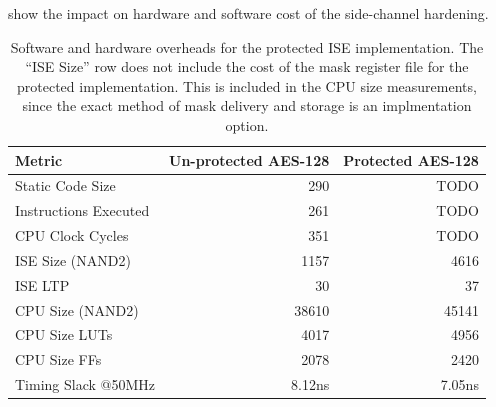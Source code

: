  show the impact on hardware and software cost
of the side-channel hardening.

\begin{table}[]
\centering
\begin{tabular}{lrr}
Metric                & Un-protected AES-128 & Protected AES-128 \\
\hline
Static Code Size      & 290                  & TODO              \\
Instructions Executed & 261                  & TODO              \\
CPU Clock Cycles      & 351                  & TODO              \\
ISE Size (NAND2)      & 1157                 & 4616              \\
ISE LTP               & 30                   & 37                \\
CPU Size (NAND2)      & 38610                & 45141             \\
CPU Size  LUTs        & 4017                 & 4956              \\
CPU Size  FFs         & 2078                 & 2420              \\
Timing Slack @50MHz   & 8.12ns               & 7.05ns
\end{tabular}
\caption{
Software and hardware overheads for the protected ISE implementation.
The ``ISE Size'' row does not include the cost of the mask register file
for the protected implementation.
This is included in the CPU size measurements, since the exact method
of mask delivery and storage is an implmentation option.
}
\label{tab:sca:sw-hw}
\end{table}

